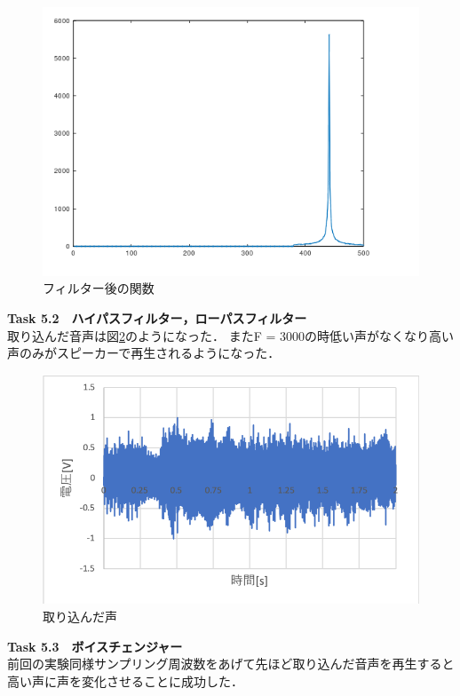 \documentclass[11pt, a4paper,twocolumn]{jarticle}
\begin{document}
\begin{figure}[htbp]
 \begin{center}
  \includegraphics[width=0.8\linewidth]{cfftmix.png}
 \end{center}
 \caption{フィルター後の関数}
 \label{fig:cfftmix}
\end{figure}

\noindent
\textbf{Task 5.2　ハイパスフィルター，ローパスフィルター} \\
取り込んだ音声は図\ref{fig:29}のようになった．
またF = 3000の時低い声がなくなり高い声のみがスピーカーで再生されるようになった．


\begin{figure}[htbp]
 \begin{center}
  \includegraphics[width=0.8\linewidth]{fig29.png}
 \end{center}
 \caption{取り込んだ声}
 \label{fig:29}
\end{figure}


\noindent
\textbf{Task 5.3　ボイスチェンジャー} \\
前回の実験同様サンプリング周波数をあげて先ほど取り込んだ音声を再生すると高い声に声を変化させることに成功した．
\end{document}
